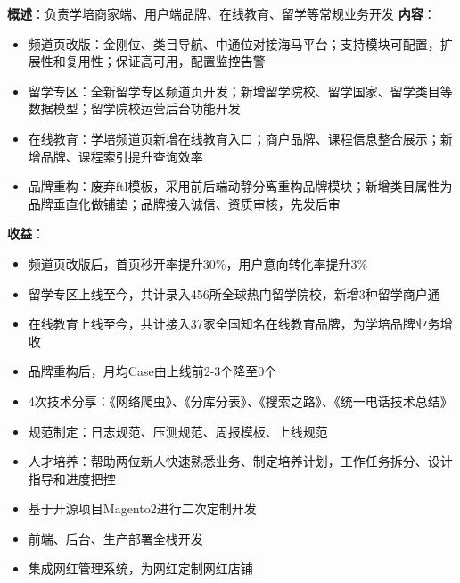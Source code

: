 \documentclass{resume}
\begin{document}
    \begin{onehalfspacing}
        \textbf{概述}：负责学培商家端、用户端品牌、在线教育、留学等常规业务开发\newline
        \textbf{内容}：
        \begin{itemize}
            \item 频道页改版：金刚位、类目导航、中通位对接海马平台；支持模块可配置，扩展性和复用性；保证高可用，配置监控告警
            \item 留学专区：全新留学专区频道页开发；新增留学院校、留学国家、留学类目等数据模型；留学院校运营后台功能开发
            \item 在线教育：学培频道页新增在线教育入口；商户品牌、课程信息整合展示；新增品牌、课程索引提升查询效率
            \item 品牌重构：废弃ftl模板，采用前后端动静分离重构品牌模块；新增类目属性为品牌垂直化做铺垫；品牌接入诚信、资质审核，先发后审
        \end{itemize}
        \textbf{收益}：
        \begin{itemize}
            \item 频道页改版后，首页秒开率提升30\%，用户意向转化率提升3\%
            \item 留学专区上线至今，共计录入456所全球热门留学院校，新增3种留学商户通
            \item 在线教育上线至今，共计接入37家全国知名在线教育品牌，为学培品牌业务增收
            \item 品牌重构后，月均Case由上线前2-3个降至0个
        \end{itemize}
    \end{onehalfspacing}
    \blankline{ }

    \begin{onehalfspacing}
        \begin{itemize}
            \item 4次技术分享：《网络爬虫》、《分库分表》、《搜索之路》、《统一电话技术总结》
            \item 规范制定：日志规范、压测规范、周报模板、上线规范
            \item 人才培养：帮助两位新人快速熟悉业务、制定培养计划，工作任务拆分、设计指导和进度把控
        \end{itemize}
    \end{onehalfspacing}
    \blankline{ }

    \begin{onehalfspacing}
        \begin{itemize}
            \item 基于开源项目Magento2进行二次定制开发
            \item 前端、后台、生产部署全栈开发
            \item 集成网红管理系统，为网红定制网红店铺
        \end{itemize}
    \end{onehalfspacing}
    \blankline{ }
\end{document}

